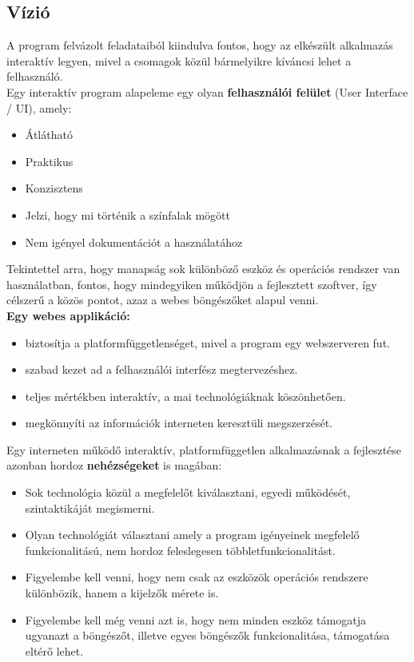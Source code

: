 \pagebreak

	\subsection{Vízió}
	
	A program felvázolt feladataiból kiindulva fontos, hogy az elkészült alkalmazás interaktív legyen, mivel a csomagok közül bármelyikre kíváncsi lehet a felhasználó.\\
	
	Egy interaktív program alapeleme egy olyan \textbf{felhasználói felület} (User Interface / UI), amely: 
	
	\begin{itemize}
		\item Átlátható
		\item Praktikus
		\item Konzisztens
		\item Jelzi, hogy mi történik a színfalak mögött
		\item Nem igényel dokumentációt a használatához
	\end{itemize}
	
	Tekintettel arra, hogy manapság sok különböző eszköz és operációs rendszer van használatban, fontos, hogy mindegyiken működjön a fejlesztett szoftver, így célszerű a közös pontot, azaz a webes böngészőket alapul venni.\\
	 
	\textbf{Egy webes applikáció:}
	\begin{itemize}
		\item biztosítja a platformfüggetlenséget, mivel a program egy webszerveren fut.
		\item szabad kezet ad a felhasználói interfész megtervezéshez.
		\item teljes mértékben interaktív, a mai technológiáknak köszönhetően.
		\item megkönnyíti az információk interneten keresztüli megszerzését.
	\end{itemize}
	
	Egy interneten működő interaktív, platformfüggetlen alkalmazásnak a fejlesztése azonban hordoz \textbf{nehézségeket} is magában:
	\begin{itemize}
		\item Sok technológia közül a megfelelőt kiválasztani, egyedi működését, szintaktikáját megismerni.
		\item Olyan technológiát választani amely a program igényeinek megfelelő funkcionalitású, nem hordoz feleslegesen többletfunkcionalitást.
		\item Figyelembe kell venni, hogy nem csak az eszközök operációs rendszere különbözik, hanem a kijelzők mérete is.
		\item Figyelembe kell még venni azt is, hogy nem minden eszköz támogatja ugyanazt a böngészőt, illetve egyes böngészők funkcionalitása, támogatása eltérő lehet.
	\end{itemize}
	

